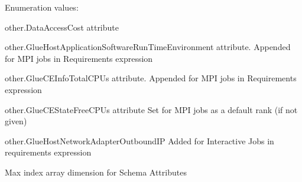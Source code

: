 \begin{Desc}
\item[Enumeration values: ]\par
\begin{description}
\item[{\em 
\hypertarget{classglite_1_1wms_1_1jdl_1_1JobAdSchema_w6w0}{
SCHEMA\_\-DAC}
\label{classglite_1_1wms_1_1jdl_1_1JobAdSchema_w6w0}
}]other.Data\-Access\-Cost attribute \item[{\em 
\hypertarget{classglite_1_1wms_1_1jdl_1_1JobAdSchema_w6w1}{
SCHEMA\_\-RTE}
\label{classglite_1_1wms_1_1jdl_1_1JobAdSchema_w6w1}
}]other.Glue\-Host\-Application\-Software\-Run\-Time\-Environment attribute. Appended for MPI jobs in Requirements expression \item[{\em 
\hypertarget{classglite_1_1wms_1_1jdl_1_1JobAdSchema_w6w2}{
SCHEMA\_\-TCPU}
\label{classglite_1_1wms_1_1jdl_1_1JobAdSchema_w6w2}
}]other.Glue\-CEInfo\-Total\-CPUs attribute. Appended for MPI jobs in Requirements expression \item[{\em 
\hypertarget{classglite_1_1wms_1_1jdl_1_1JobAdSchema_w6w3}{
SCHEMA\_\-FCPU}
\label{classglite_1_1wms_1_1jdl_1_1JobAdSchema_w6w3}
}]other.Glue\-CEState\-Free\-CPUs attribute Set for MPI jobs as a default rank (if not given) \item[{\em 
\hypertarget{classglite_1_1wms_1_1jdl_1_1JobAdSchema_w6w4}{
SCHEMA\_\-OIP}
\label{classglite_1_1wms_1_1jdl_1_1JobAdSchema_w6w4}
}]other.Glue\-Host\-Network\-Adapter\-Outbound\-IP Added for Interactive Jobs in requirements expression \item[{\em 
\hypertarget{classglite_1_1wms_1_1jdl_1_1JobAdSchema_w6w5}{
SCHEMA\_\-ARRAY}
\label{classglite_1_1wms_1_1jdl_1_1JobAdSchema_w6w5}
}]Max index array dimension for Schema Attributes \end{description}
\end{Desc}



